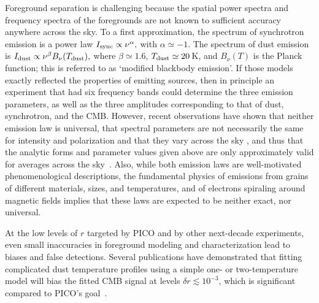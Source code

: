 \documentclass[PICOReport.tex]{subfiles}
\begin{document}
Foreground separation is challenging because the spatial power spectra and frequency spectra of the foregrounds are not known to sufficient accuracy anywhere across the sky.
To a first approximation, the spectrum of synchrotron emission is a power law $I_{\rm sync} \propto \nu^{\alpha},$ with $\alpha \simeq -1$.  The spectrum of dust emission is $I_{\rm dust} \propto \nu^{\beta} B_\nu(T_{\rm dust}),$ where $\beta \simeq 1.6$, $T_{\rm dust} \simeq 20$\,K, and $B_\nu(T)$ is the Planck function; this is referred to as `modified blackbody emission'. If those models exactly reflected the properties of emitting sources, then in principle an experiment that had six frequency bands could determine the three emission parameters, as well as the three amplitudes corresponding to that of dust, synchrotron, and the CMB. However, recent observations have shown that neither emission law is universal, that spectral parameters are not necessarily the same for intensity and polarization and that they vary across the sky \cite{SPASS_2018_variation,fuskeland2014_wmap_variation,planck_2013_xi}, and thus that the analytic forms and parameter values given above are only approximately valid for averages across the sky~\citep{chluba2017foregrounds}. Also, while both emission laws are well-motivated phenomenological descriptions, the fundamental physics of emissions from grains of different materials, sizes, and temperatures, and of electrons spiraling around magnetic fields implies that these laws are expected to be neither exact, nor universal. 

At the low levels of $r$ targeted by PICO and by other next-decade experiments, even small inaccuracies in foreground modeling and characterization lead to biases and false detections. Several publications have demonstrated that fitting complicated dust temperature profiles using a simple one- or two-temperature model will bias the fitted CMB signal at levels $\delta r \lesssim 10^{-3}$, which is significant compared to PICO's goal~\citep{fantaye2011,armitage-caplan2012,kogut_fixsen2016,remazeilles/etal:2016,stompor2016}. 

\end{document}
